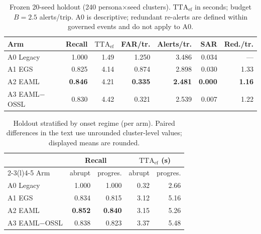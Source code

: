 \documentclass[conference]{IEEEtran}
\newcommand{\ttaef}{\mathrm{TTA}_{\mathrm{ef}}}
\begin{document}
\begin{table}[!t]
\caption{Frozen 20-seed holdout (240 persona$\times$seed clusters).
$\ttaef$ in seconds; budget $B{=}2.5$ alerts/trip. A0 is descriptive;
redundant re-alerts are defined within governed events and do not apply
to A0.}
\label{tab:holdout}
\centering\scriptsize
\setlength{\tabcolsep}{2.6pt}
\begin{tabular}{@{}lrrrrrr@{}}
\toprule
Arm & Recall & $\ttaef$ & FAR/tr. & Alerts/tr. & SAR & Red./tr.\\
\midrule
A0 Legacy & 1.000 & 1.49 & 1.250 & 3.486 & 0.034 & ---\\
A1 EGS & 0.825 & 4.14 & 0.874 & 2.898 & 0.030 & 1.33\\
A2 EAML & \textbf{0.846} & 4.21 & \textbf{0.335} & \textbf{2.481} &
\textbf{0.000} & \textbf{1.16}\\
A3 EAML$-$OSSL & 0.830 & 4.42 & 0.321 & 2.539 & 0.007 & 1.22\\
\bottomrule
\end{tabular}
\end{table}

\begin{table}[!t]
\caption{Holdout stratified by onset regime (per arm). Paired
differences in the text use unrounded cluster-level values; displayed
means are rounded.}
\label{tab:strat}
\centering\scriptsize
\setlength{\tabcolsep}{4pt}
\begin{tabular}{@{}lrrrr@{}}
\toprule
 & \multicolumn{2}{c}{Recall} & \multicolumn{2}{c}{$\ttaef$ (s)}\\
\cmidrule(lr){2-3}\cmidrule(l){4-5}
Arm & abrupt & progres. & abrupt & progres.\\
\midrule
A0 Legacy & 1.000 & 1.000 & 0.32 & 2.66\\
A1 EGS & 0.834 & 0.815 & 3.12 & 5.16\\
A2 EAML & \textbf{0.852} & \textbf{0.840} & 3.15 & 5.26\\
A3 EAML$-$OSSL & 0.838 & 0.823 & 3.37 & 5.48\\
\bottomrule
\end{tabular}
\end{table}
\end{document}
